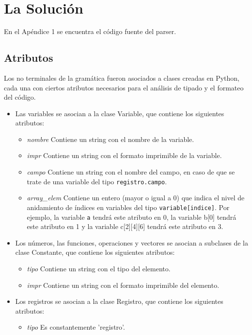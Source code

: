 \section{La Solución}

En el Apéndice 1 se encuentra el código fuente del parser.

\subsection{Atributos}

Los no terminales de la gramática fueron asociados a clases creadas en Python, cada una con ciertos atributos necesarios para el análisis de tipado y el formateo del código.

\begin{itemize}
\item Las variables se asocian a la clase Variable, que contiene los siguientes atributos:
	\begin{itemize}
	\item {\it nombre} Contiene un string con el nombre de la variable.
	\item {\it impr} Contiene un string con el formato imprimible de la variable.
	\item {\it campo} Contiene un string con el nombre del campo, en caso de que se trate de una variable del tipo {\tt registro.campo}.
	\item {\it array_elem} Contiene un entero (mayor o igual a 0) que indica el nivel de anidamiento de índices en variables del tipo {\tt variable[indice]}. Por ejemplo, la variable {\tt a} tendrá este atributo en 0, la variable b[0] tendrá este atributo en 1 y la variable c[2][4][6] tendrá este atributo en 3.
	\end{itemize}
\item Los números, las funciones, operaciones y vectores se asocian a subclases de la clase Constante, que contiene los siguientes atributos:
	\begin{itemize}
	\item {\it tipo} Contiene un string con el tipo del elemento.
	\item {\it impr} Contiene un string con el formato imprimible del elemento.
	\end{itemize}
\item Los registros se asocian a la clase Registro, que contiene los siguientes atributos:
	\begin{itemize}
	\item {\it tipo} Es constantemente 'registro'.

\end{itemize}
\end{itemize}
